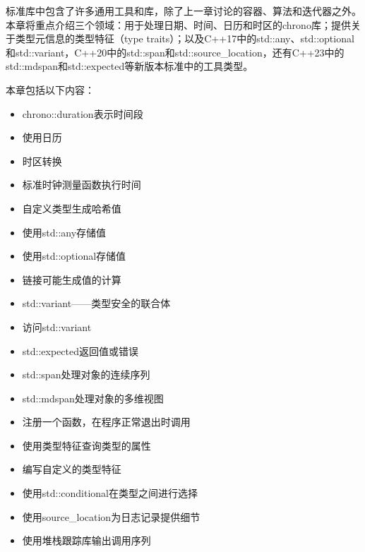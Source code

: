 标准库中包含了许多通用工具和库，除了上一章讨论的容器、算法和迭代器之外。本章将重点介绍三个领域：用于处理日期、时间、日历和时区的chrono库；提供关于类型元信息的类型特征（type traits）；以及C++17中的std::any、std::optional和std::variant，C++20中的std::span和std::source\_location，还有C++23中的std::mdspan和std::expected等新版本标准中的工具类型。

本章包括以下内容：

\begin{itemize}
\item
chrono::duration表示时间段

\item
使用日历

\item
时区转换

\item
标准时钟测量函数执行时间

\item
自定义类型生成哈希值

\item
使用std::any存储值

\item
使用std::optional存储值

\item
链接可能生成值的计算

\item
std::variant——类型安全的联合体

\item
访问std::variant

\item
std::expected返回值或错误

\item
std::span处理对象的连续序列

\item
std::mdspan处理对象的多维视图

\item
注册一个函数，在程序正常退出时调用

\item
使用类型特征查询类型的属性

\item
编写自定义的类型特征

\item
使用std::conditional在类型之间进行选择

\item
使用source\_location为日志记录提供细节

\item
使用堆栈跟踪库输出调用序列
\end{itemize}
